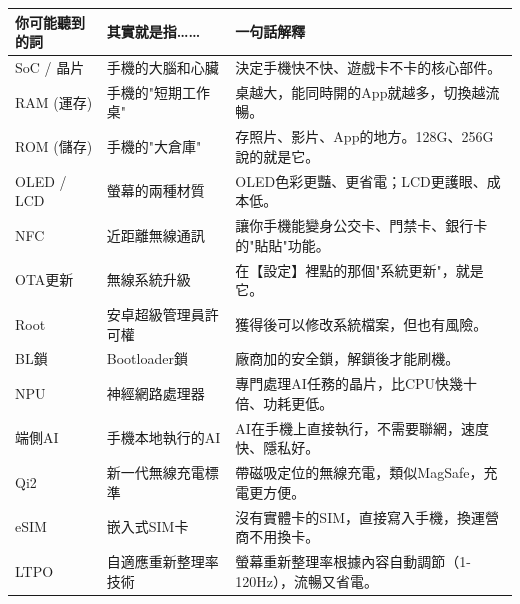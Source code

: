 
\begin{center}
\begin{tabularx}{\linewidth}{|X|X|X|}
\hline
\textbf{你可能聽到的詞} & \textbf{其實就是指……} & \textbf{一句話解釋} \tabularnewline
\hline
SoC / 晶片 & 手機的大腦和心臟 & 決定手機快不快、遊戲卡不卡的核心部件。 \tabularnewline
RAM (運存) & 手機的"短期工作桌" & 桌越大，能同時開的App就越多，切換越流暢。 \tabularnewline
ROM (儲存) & 手機的"大倉庫" & 存照片、影片、App的地方。128G、256G說的就是它。 \tabularnewline
OLED / LCD & 螢幕的兩種材質 & OLED色彩更豔、更省電；LCD更護眼、成本低。 \tabularnewline
NFC & 近距離無線通訊 & 讓你手機能變身公交卡、門禁卡、銀行卡的"貼貼"功能。 \tabularnewline
OTA更新 & 無線系統升級 & 在【設定】裡點的那個"系統更新"，就是它。 \tabularnewline
Root & 安卓超級管理員許可權 & 獲得後可以修改系統檔案，但也有風險。 \tabularnewline
BL鎖 & Bootloader鎖 & 廠商加的安全鎖，解鎖後才能刷機。 \tabularnewline
NPU & 神經網路處理器 & 專門處理AI任務的晶片，比CPU快幾十倍、功耗更低。 \tabularnewline
端側AI & 手機本地執行的AI & AI在手機上直接執行，不需要聯網，速度快、隱私好。 \tabularnewline
Qi2 & 新一代無線充電標準 & 帶磁吸定位的無線充電，類似MagSafe，充電更方便。 \tabularnewline
eSIM & 嵌入式SIM卡 & 沒有實體卡的SIM，直接寫入手機，換運營商不用換卡。 \tabularnewline
LTPO & 自適應重新整理率技術 & 螢幕重新整理率根據內容自動調節（1-120Hz），流暢又省電。 \tabularnewline
\hline
\end{tabularx}
\end{center}
